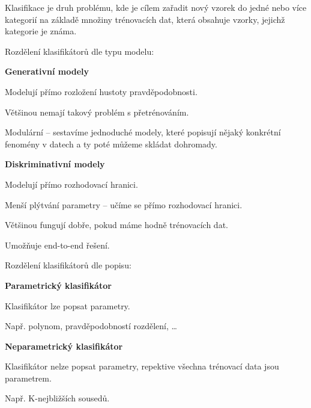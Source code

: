\begin{compactitem}
    \item Klasifikace je druh problému, kde je cílem zařadit nový vzorek do jedné nebo více kategorií na základě množiny trénovacích dat, která obsahuje vzorky, jejichž kategorie je známa.

    \item Rozdělení klasifikátorů dle typu modelu: \begin{compactitem}
        \item \textbf{Generativní modely} \begin{compactitem}
            \item Modelují přímo rozložení hustoty pravděpodobnosti.
            \item Většinou nemají takový problém s přetrénováním.
            \item Modulární -- sestavíme jednoduché modely, které popisují nějaký konkrétní fenomény v datech a ty poté můžeme skládat dohromady.
        \end{compactitem}

        \item \textbf{Diskriminativní modely} \begin{compactitem}
            \item Modelují přímo rozhodovací hranici.
            \item Menší plýtvání parametry -- učíme se přímo rozhodovací hranici.
            \item Většinou fungují dobře, pokud máme hodně trénovacích dat.
            \item Umožňuje end-to-end řešení.
        \end{compactitem}
    \end{compactitem}

    \item Rozdělení klasifikátorů dle popisu: \begin{compactitem}
        \item \textbf{Parametrický klasifikátor} \begin{compactitem}
            \item Klasifikátor lze popsat parametry.
            \item Např. polynom, pravděpodobností rozdělení, \dots
        \end{compactitem}

        \item \textbf{Neparametrický klasifikátor} \begin{compactitem}
            \item Klasifikátor nelze popsat parametry, repektive všechna trénovací data jsou parametrem.
            \item Např. K-nejbližších sousedů.
        \end{compactitem}
    \end{compactitem}
\end{compactitem}

